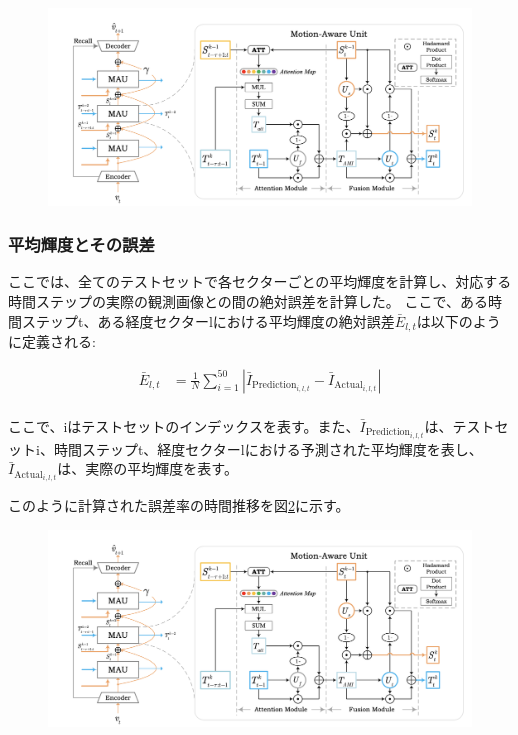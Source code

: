        \begin{figure}[htpb]
          \centering
          \includegraphics[width=\textwidth]{figures/mau.png}
          \caption{}
          \label{fig:exp1_longitude_division}
        \end{figure}

        \subsubsection{平均輝度とその誤差}
          ここでは、全てのテストセットで各セクターごとの平均輝度を計算し、対応する時間ステップの実際の観測画像との間の絶対誤差を計算した。
          ここで、ある時間ステップt、ある経度セクターlにおける平均輝度の絶対誤差\( \bar{E}_{l,t} \)は以下のように定義される:
          
          \begin{align}
            \bar{E}_{l, t} & = \frac{1}{N} \sum_{i=1}^{50} | \bar{I}_{\text{Prediction}_ {i, l, t}} - \bar{I}_{\text{Actual}_{i, l, t}} | \\
          \end{align}
            
          ここで、iはテストセットのインデックスを表す。また、\( \bar{I}_{\text{Prediction}_{i, l, t}} \)は、テストセットi、時間ステップt、経度セクターlにおける予測された平均輝度を表し、\( \bar{I}_{\text{Actual}_{i, l, t}} \)は、実際の平均輝度を表す。  

          このように計算された誤差率の時間推移を図\ref{fig:exp1_mean_intensity_longitude_line}に示す。
          
          \begin{figure}[htpb]
            \centering
            \includegraphics[width=\textwidth]{figures/mau.png}
            \caption{}
            \label{fig:exp1_mean_intensity_longitude_line}
          \end{figure}
          

